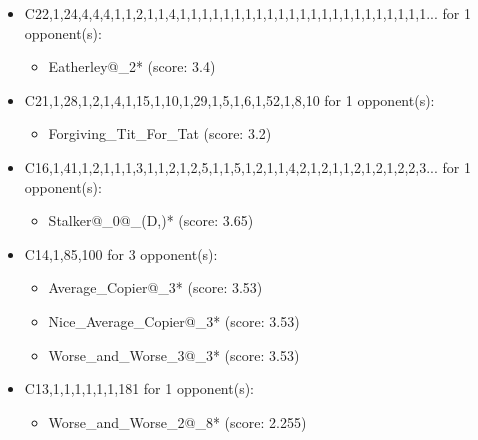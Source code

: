 \begin{appendices}
\begin{itemize}
    \item C22,1,24,4,4,4,1,1,2,1,1,4,1,1,1,1,1,1,1,1,1,1,1,1,1,1,1,1,1,1,1,1,1,1,1... for 1 opponent(s):
    \begin{multicols}{3}
         \begin{itemize}
            \item Eatherley@\_2* (score: 3.4)
        \end{itemize}
     \end{multicols}
     
    \item C21,1,28,1,2,1,4,1,15,1,10,1,29,1,5,1,6,1,52,1,8,10 for 1 opponent(s):
    \begin{multicols}{3}
         \begin{itemize}
            \item Forgiving\_Tit\_For\_Tat (score: 3.2)
        \end{itemize}
     \end{multicols}
     
    \item C16,1,41,1,2,1,1,1,3,1,1,2,1,2,5,1,1,5,1,2,1,1,4,2,1,2,1,1,2,1,2,1,2,2,3... for 1 opponent(s):
    \begin{multicols}{3}
         \begin{itemize}
            \item Stalker@\_0@\_(D,)* (score: 3.65)
        \end{itemize}
     \end{multicols}
     
    \item C14,1,85,100 for 3 opponent(s):
    \begin{multicols}{3}
         \begin{itemize}
            \item Average\_Copier@\_3* (score: 3.53)
            \item Nice\_Average\_Copier@\_3* (score: 3.53)
            \item Worse\_and\_Worse\_3@\_3* (score: 3.53)
        \end{itemize}
     \end{multicols}
     
    \item C13,1,1,1,1,1,1,181 for 1 opponent(s):
    \begin{multicols}{3}
         \begin{itemize}
            \item Worse\_and\_Worse\_2@\_8* (score: 2.255)
        \end{itemize}
     \end{multicols}
     

\end{itemize}
\end{appendices}
